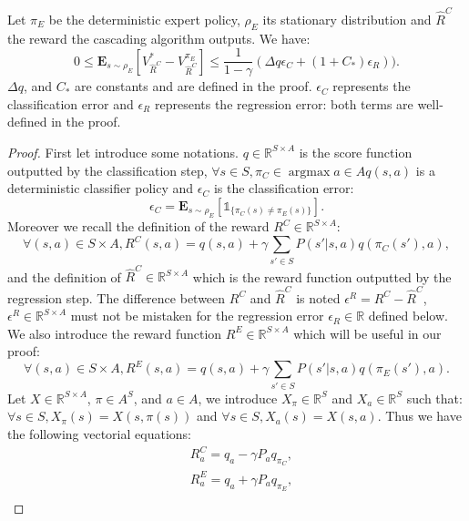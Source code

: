 \documentclass[smallextended]{svjour3}
\newcommand{\E}{\mathbf{E}}
\newcommand{\argmax}{\operatorname*{argmax}} %
\begin{document}
\begin{theorem}
\label{theorem: theorem analysis}
Let $\pi_E$ be the deterministic expert policy, $\rho_E$ its stationary distribution and $\hat{R}^C$ the reward the cascading algorithm outputs. We have:
\begin{equation}
0\leq\E_{s\sim\rho_E}[V^*_{\hat{R}^C}-V^{\pi_E}_{\hat{R}^C}]\leq \frac{1}{1-\gamma}(\Delta q \epsilon_C+(1+C_*)\epsilon_R)).
\end{equation}
$\Delta q$, and $C_*$ are constants and are defined in the proof. $\epsilon_C$ represents the classification error and $\epsilon_R$ represents the regression error: both terms are well-defined in the proof.
\end{theorem}
\begin{proof}
First let introduce some notations. $q\in\mathbb{R}^{S\times A}$ is the score function outputted by the classification step, $\forall s \in S,\pi_C\in\argmax{a\in A}q(s,a)$ is a deterministic classifier policy and $\epsilon_C$ is the classification error:
\begin{equation}
\epsilon_C=\E_{s\sim\rho_E}[\mathds{1}_{\{\pi_C(s)\neq\pi_E(s)\}}].
\end{equation}
Moreover we recall the definition of the reward $R^C\in\mathbb{R}^{S\times A}$:
\begin{equation}
\forall (s,a)\in S\times A, R^C(s,a)=q(s,a) +\gamma\sum_{s'\in S}P(s'|s,a)q(\pi_C(s'),a),
\end{equation}
and the definition of $\hat{R}^C\in\mathbb{R}^{S\times A}$ which is the reward function outputted by the regression step.
The difference between $R^C$ and $\hat{R}^C$ is noted $\epsilon^R=R^C-\hat{R}^C$, $\epsilon^R\in\mathbb{R}^{S\times A}$ must not be mistaken for the regression error $\epsilon_R\in\mathbb{R}$ defined below.
We also introduce the reward function $R^E\in\mathbb{R}^{S\times A}$ which will be useful in our proof:
\begin{equation}
\forall (s,a)\in S\times A, R^E(s,a)=q(s,a) +\gamma\sum_{s'\in S}P(s'|s,a)q(\pi_E(s'),a).
\end{equation}
Let $X\in\mathbb{R}^{S\times A}$, $\pi\in A^S$, and $a\in A$, we introduce $X_\pi\in\mathbb{R}^S$ and $X_a\in\mathbb{R}^S$ such that: $\forall s\in S, X_\pi(s)=X(s,\pi(s))$ and $\forall s\in S, X_a(s)=X(s,a)$.
Thus we have the following vectorial equations:
\begin{align}
&R^C_a=q_a-\gamma P_aq_{\pi_C},
\\
&R^E_a=q_a+\gamma P_aq_{\pi_E},
\\

\end{align}
\end{proof}
\end{document}
